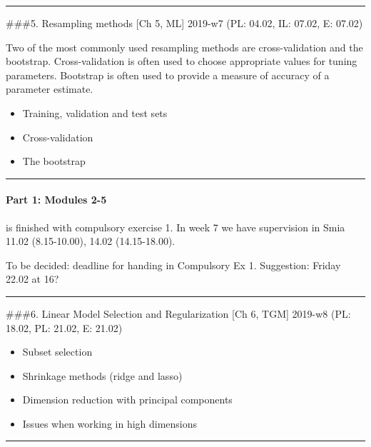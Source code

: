 \documentclass[]{article}
\providecommand{\tightlist}{%
  \setlength{\itemsep}{0pt}\setlength{\parskip}{0pt}}
\let\oldparagraph\paragraph
\renewcommand{\paragraph}[1]{\oldparagraph{#1}\mbox{}}
\begin{document}
\begin{center}\rule{0.5\linewidth}{\linethickness}\end{center}

\#\#\#5. Resampling methods {[}Ch 5, ML{]} 2019-w7 (PL: 04.02, IL:
07.02, E: 07.02)

Two of the most commonly used resampling methods are cross-validation
and the bootstrap. Cross-validation is often used to choose appropriate
values for tuning parameters. Bootstrap is often used to provide a
measure of accuracy of a parameter estimate.

\begin{itemize}
\tightlist
\item
  Training, validation and test sets
\item
  Cross-validation
\item
  The bootstrap
\end{itemize}

\begin{center}\rule{0.5\linewidth}{\linethickness}\end{center}

\hypertarget{part-1-modules-2-5}{%
\paragraph{Part 1: Modules 2-5}\label{part-1-modules-2-5}}

is finished with compulsory exercise 1. In week 7 we have supervision in
Smia 11.02 (8.15-10.00), 14.02 (14.15-18.00).

To be decided: deadline for handing in Compulsory Ex 1. Suggestion:
Friday 22.02 at 16?

\begin{center}\rule{0.5\linewidth}{\linethickness}\end{center}

\#\#\#6. Linear Model Selection and Regularization {[}Ch 6, TGM{]}
2019-w8 (PL: 18.02, PL: 21.02, E: 21.02)

\begin{itemize}
\tightlist
\item
  Subset selection
\item
  Shrinkage methods (ridge and lasso)
\item
  Dimension reduction with principal components
\item
  Issues when working in high dimensions
\end{itemize}

\begin{center}\rule{0.5\linewidth}{\linethickness}\end{center}
\end{document}
